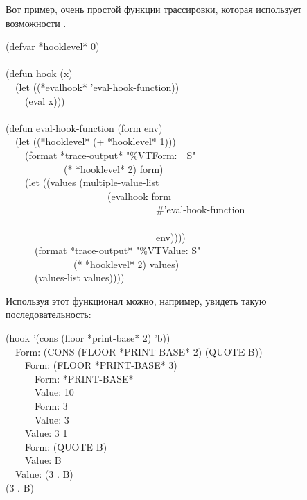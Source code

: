 \begin{defun}[Функция]
Вот пример, очень простой функции трассировки, которая использует возможности
.
\begin{lisp}
(defvar *hooklevel* 0) \\
 \\
(defun hook (x) \\
~~(let ((*evalhook* 'eval-hook-function)) \\
~~~~(eval x))) \\
 \\
(defun eval-hook-function (form  env) \\
~~(let ((*hooklevel* (+ *hooklevel* 1))) \\
~~~~(format *trace-output* "{\Xtilde}\%{\Xtilde}V{\Xatsign}TForm:~~{\Xtilde}S" \\
~~~~~~~~~~~~(* *hooklevel* 2) form) \\
~~~~(let ((values (multiple-value-list \\
~~~~~~~~~~~~~~~~~~~~~(evalhook form \\
~~~~~~~~~~~~~~~~~~~~~~~~~~~~~~~\#'eval-hook-function \\
~~~~~~~~~~~~~~~~~~~~~~~~~~~~~~~{\nil} \\
~~~~~~~~~~~~~~~~~~~~~~~~~~~~~~~env)))) \\
~~~~~~(format *trace-output* "{\Xtilde}\%{\Xtilde}V{\Xatsign}TValue:{\Xtilde}{\Xlbrace} {\Xtilde}S{\Xtilde}{\Xrbrace}" \\
~~~~~~~~~~~~~~(* *hooklevel* 2) values) \\
~~~~~~(values-list values))))
\end{lisp}
Используя этот функционал можно, например, увидеть такую последовательность:
\begin{lisp}
(hook '(cons (floor *print-base* 2) 'b)) \\
~~Form:  (CONS (FLOOR *PRINT-BASE* 2) (QUOTE B)) \\
~~~~Form:  (FLOOR *PRINT-BASE* 3) \\
~~~~~~Form:  *PRINT-BASE* \\
~~~~~~Value: 10 \\
~~~~~~Form:  3 \\
~~~~~~Value: 3 \\
~~~~Value: 3 1 \\
~~~~Form:  (QUOTE B) \\
~~~~Value: B \\
~~Value: (3 . B) \\
(3 . B)
\end{lisp}
\end{defun}


